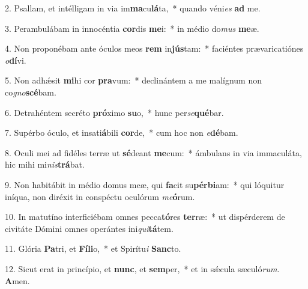 2. Psallam, et intélligam in via im\textbf{ma}cu\textbf{lá}ta,~*  quando véni\textit{es} \textbf{ad} me.\

3. Perambulábam in innocéntia \textbf{cor}dis \textbf{me}i:~*  in médio do\textit{mus} \textbf{me}æ.\

4. Non proponébam ante óculos meos \textbf{rem} in\textbf{jús}tam:~*  faciéntes prævaricatiónes \textit{o}\textbf{dí}vi.\

5. Non adhǽsit \textbf{mi}hi cor \textbf{pra}vum:~*  declinántem a me malígnum non co\textit{gno}\textbf{scé}bam.\

6. Detrahéntem secréto \textbf{pró}ximo \textbf{su}o,~*  hunc per\textit{se}\textbf{qué}bar.\

7. Supérbo óculo, et insati\textbf{á}bili \textbf{cor}de,~*  cum hoc non \textit{e}\textbf{dé}bam.\

8. Oculi mei ad fidéles terræ ut \textbf{sé}deant \textbf{me}cum:~*  ámbulans in via immaculáta, hic mihi mi\textit{nis}\textbf{trá}bat.\

9. Non habitábit in médio domus meæ, qui \textbf{fa}cit su\textbf{pér}\textbf{bi}am:~*  qui lóquitur iníqua, non diréxit in conspéctu oculórum \textit{me}\textbf{ó}rum.\

10. In matutíno interficiébam omnes pecca\textbf{tó}res \textbf{ter}ræ:~*  ut dispérderem de civitáte Dómini omnes operántes ini\textit{qui}\textbf{tá}tem.\

11. Glória \textbf{Pa}tri, et \textbf{Fí}\textbf{li}o,~*  et Spirítu\textit{i} \textbf{Sanc}to.\

12. Sicut erat in princípio, et \textbf{nunc}, et \textbf{sem}per,~*  et in sǽcula sæculó\textit{rum}. \textbf{A}men.\

